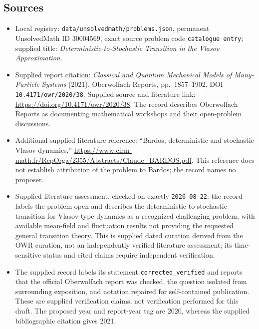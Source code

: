 \documentclass[11pt]{article}
\begin{document}
\subsection{Sources}
\begin{itemize}
\item Local registry: \texttt{data/unsolvedmath/problems.json}, permanent UnsolvedMath ID \(30004569\), exact source problem code \texttt{catalogue entry}; supplied title: \emph{Deterministic-to-Stochastic Transition in the Vlasov Approximation}.
\item Supplied report citation: \emph{Classical and Quantum Mechanical Models of Many-Particle Systems} (2021), Oberwolfach Reports, pp.\ 1857--1902, DOI \texttt{10.4171/owr/2020/38}. Supplied source and literature link: \url{https://doi.org/10.4171/owr/2020/38}. The record describes Oberwolfach Reports as documenting mathematical workshops and their open-problem discussions.
\item Additional supplied literature reference: ``Bardos, deterministic and stochastic Vlasov dynamics,'' \url{https://www.cirm-math.fr/RepOrga/2355/Abstracts/Claude_BARDOS.pdf}. This reference does not establish attribution of the problem to Bardos; the record names no proposer.
\item Supplied literature assessment, checked on exactly \texttt{2026-08-22}: the record labels the problem open and describes the deterministic-to-stochastic transition for Vlasov-type dynamics as a recognized challenging problem, with available mean-field and fluctuation results not providing the requested general transition theory. This is supplied dated curation derived from the OWR curation, not an independently verified literature assessment; its time-sensitive status and cited claims require independent verification.
\item The supplied record labels its statement \texttt{corrected\_verified} and reports that the official Oberwolfach report was checked, the question isolated from surrounding exposition, and notation repaired for self-contained publication. These are supplied verification claims, not verification performed for this draft. The proposed year and report-year tag are 2020, whereas the supplied bibliographic citation gives 2021.
\end{itemize}
\end{document}
